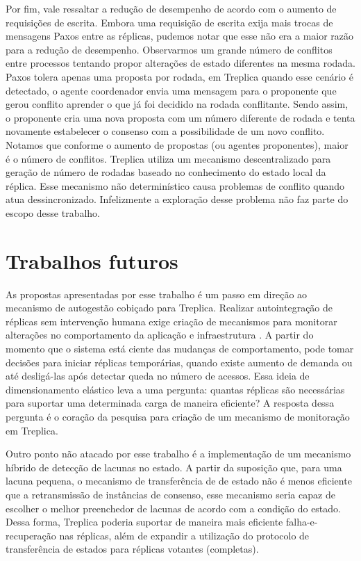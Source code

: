 Por fim, vale ressaltar a redução de desempenho de acordo com o aumento de requisições de
escrita. Embora uma requisição de escrita exija mais trocas de mensagens Paxos entre as
réplicas, pudemos notar que esse não era a maior razão para a redução de desempenho.
Observarmos um grande número de conflitos entre processos tentando propor alterações de
estado diferentes na mesma rodada. Paxos tolera apenas uma proposta por rodada, em
Treplica quando esse cenário é detectado, o agente coordenador envia uma mensagem para o
proponente que gerou conflito aprender o que já foi decidido na rodada conflitante. Sendo
assim, o proponente cria uma nova proposta com um número diferente de rodada e tenta
novamente estabelecer o consenso com a possibilidade de um novo conflito. Notamos que
conforme o aumento de propostas (ou agentes proponentes), maior é o número de conflitos.
Treplica utiliza um mecanismo descentralizado para geração de número de rodadas baseado
no conhecimento do estado local da réplica. Esse mecanismo não determinístico causa
problemas de conflito quando atua dessincronizado. Infelizmente a exploração desse
problema não faz parte do escopo desse trabalho.


\section*{Trabalhos futuros}

As propostas apresentadas por esse trabalho é um passo em direção ao mecanismo de
autogestão cobiçado para Treplica. Realizar autointegração de réplicas sem intervenção
humana exige criação de mecanismos para monitorar alterações no comportamento da aplicação
e infraestrutura \cite{renesse03, pierre06}. A partir do momento que o sistema está ciente
das mudanças de comportamento, pode tomar decisões para iniciar réplicas temporárias,
quando existe aumento de demanda ou até desligá-las após detectar queda no número de
acessos. Essa ideia de dimensionamento elástico leva a uma pergunta: quantas réplicas são
necessárias para suportar uma determinada carga de maneira eficiente? A resposta dessa
pergunta é o coração da pesquisa para criação de um mecanismo de monitoração em Treplica.

Outro ponto não atacado por esse trabalho é a implementação de um mecanismo híbrido de
detecção de lacunas no estado. A partir da suposição que, para uma lacuna pequena, o
mecanismo de transferência de de estado não é menos eficiente que a retransmissão de
instâncias de consenso, esse mecanismo seria capaz de escolher o melhor preenchedor de
lacunas de acordo com a condição do estado. Dessa forma, Treplica poderia suportar de
maneira mais eficiente falha-e-recuperação nas réplicas, além de expandir a utilização do
protocolo de transferência de estados para réplicas votantes (completas).

